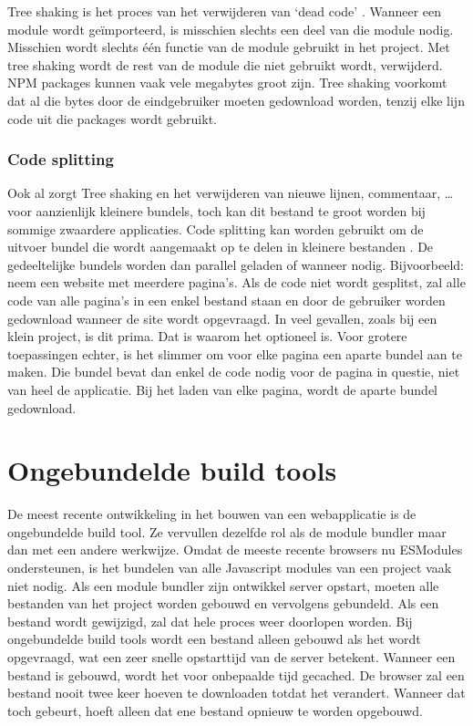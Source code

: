 Tree shaking is het proces van het verwijderen van ‘dead code’ \autocite{webpack-no-dateC}. Wanneer een module wordt geïmporteerd, is misschien slechts een deel van die module nodig. Misschien wordt slechts één functie van de module gebruikt in het project. Met tree shaking wordt de rest van de module die niet gebruikt wordt, verwijderd. NPM \gls{packages} kunnen vaak vele megabytes groot zijn. Tree shaking voorkomt dat al die bytes door de eindgebruiker moeten gedownload worden, tenzij elke lijn code uit die \gls{packages} wordt gebruikt. 

\subsubsection{Code splitting}

Ook al zorgt Tree shaking en het verwijderen van nieuwe lijnen, commentaar, … voor aanzienlijk kleinere bundels, toch kan dit bestand te groot worden bij sommige zwaardere applicaties. Code splitting kan worden gebruikt om de uitvoer bundel die wordt aangemaakt op te delen in kleinere bestanden \autocite{mozilla-2021D}. De gedeeltelijke bundels worden dan parallel geladen of wanneer nodig. Bijvoorbeeld: neem een website met meerdere pagina's. Als de code niet wordt gesplitst, zal alle code van alle pagina's in een enkel bestand staan en door de gebruiker worden gedownload wanneer de site wordt opgevraagd. In veel gevallen, zoals bij een klein project, is dit prima. Dat is waarom het optioneel is. Voor grotere toepassingen echter, is het slimmer om voor elke pagina een aparte bundel aan te maken. Die bundel bevat dan enkel de code nodig voor de pagina in questie, niet van heel de applicatie. Bij het laden van elke pagina, wordt de aparte bundel gedownload.

\section{Ongebundelde build tools}
De meest recente ontwikkeling in het bouwen van een webapplicatie is de ongebundelde build tool. Ze vervullen dezelfde rol als de module bundler maar dan met een andere werkwijze. Omdat de meeste recente browsers nu ESModules ondersteunen, is het bundelen van alle \gls{Javascript} modules van een project vaak niet nodig. Als een module bundler zijn ontwikkel server opstart, moeten alle bestanden van het project worden gebouwd en vervolgens gebundeld. Als een bestand wordt gewijzigd, zal dat hele proces weer doorlopen worden. Bij ongebundelde build tools wordt een bestand alleen gebouwd als het wordt opgevraagd, wat een zeer snelle opstarttijd van de server betekent. Wanneer een bestand is gebouwd, wordt het voor onbepaalde tijd gecached. De browser zal een bestand nooit twee keer hoeven te downloaden totdat het verandert. Wanneer dat toch gebeurt, hoeft alleen dat ene bestand opnieuw te worden opgebouwd. 

